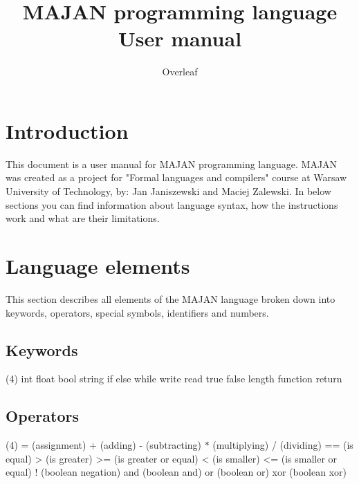 \documentclass{ol-softwaremanual}
\title{MAJAN programming language \\User manual}
\author{Overleaf}
\begin{document}
\maketitle

\tableofcontents

\newpage

\section{Introduction}

This document is a user manual for MAJAN programming language. MAJAN was created as a project for "Formal languages and compilers" course at Warsaw University of Technology, by: Jan Janiszewski and Maciej Zalewski. In below sections you can find information about language syntax, how the instructions work and what are their limitations. 

\section{Language elements}

This section describes all elements of the MAJAN language broken down into keywords, operators, special symbols, identifiers and numbers.
\subsection{Keywords}


\begin{tasks}[label = {\bf \arabic*.}, label-align=left, label-offset={0mm}, label-width={5mm}, item-indent={5mm}, label-format={\bfseries}, column-sep=10mm](4)
\task int
\task float
\task bool
\task string
\task if
\task else
\task while
\task write
\task read
\task true
\task false
\task length
\task function
\task return

\end{tasks}


\subsection{Operators}

\begin{tasks}[label = {\bf \arabic*.}, label-align=left, label-offset={0mm}, label-width={5mm}, item-indent={5mm}, label-format={\bfseries}, column-sep=10mm](4)
\task = (assignment)
\task + (adding)
\task - (subtracting)
\task $*$ (multiplying)
\task / (dividing)
\task == (is equal)
\task > (is greater)
\task >= (is greater or equal)
\task < (is smaller)
\task <= (is smaller or equal)
\task $!$ (boolean negation)
\task and (boolean and)
\task or (boolean or)
\task xor (boolean xor)
\end{tasks}
\end{document}
